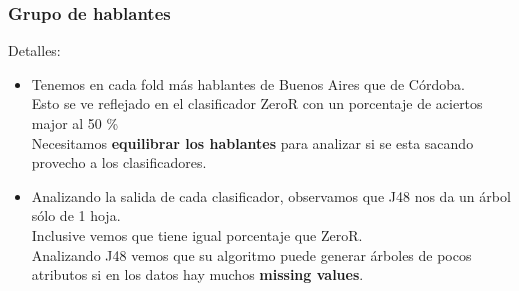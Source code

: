 \documentclass[mathserif]{beamer}%
\begin{document}
\begin{frame}
	\frametitle{Grupo de hablantes}
	
	Detalles:
	\begin{itemize}
		\item Tenemos en cada fold más hablantes de Buenos Aires que de Córdoba. \\
		Esto se ve reflejado en el clasificador ZeroR con un porcentaje de aciertos major al 50 \% \\
		Necesitamos \textbf{equilibrar los hablantes} para analizar si se esta sacando provecho a los clasificadores.

		\pause

		\item Analizando la salida de cada clasificador, observamos que J48 nos da un árbol sólo de 1 hoja. \\
		Inclusive vemos que tiene igual porcentaje que ZeroR. \\
		Analizando J48 vemos que su algoritmo puede generar árboles de pocos atributos si en los datos hay muchos \textbf{missing values}.
	\end{itemize}
\end{frame}
\end{document}
